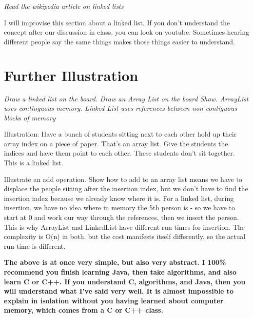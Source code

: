 \documentclass[12pt]{article}
\begin{document}
\textit{Read the wikipedia article on linked lists}

I will improvise this section about a linked list. If you don't understand the concept after our discussion in class, you can look on youtube. Sometimes hearing different people say the same things makes those things easier to understand.

\section{Further Illustration}
\begin{center}
{\LARGE \textit{Draw a linked list on the board. Draw an Array List on the board Show. ArrayList uses continguous memory. Linked List uses references between non-contiguous blocks of memory}}
\end{center}

\begin{center}
{\LARGE Illustration: Have a  bunch of students sitting next to each other hold up their array index on a piece of paper. That's an array list. Give the students the indices and have them point to each other. These students don't sit together. This is a linked list.}
\end{center}

\begin{center}
{\LARGE Illustrate an add operation. Show how to add to an array list means we have to displace the people sitting after the insertion index, but we don't have to find the insertion index because we already know where it is. For a linked list, during insertion, we have no idea where in memory the 5th person is - so we have to start at 0 and work our way through the references, then we insert the person. This is why ArrayList and LinkedList have different run times for insertion. The complexity is O(n) in both, but the cost manifests itself differently, so the actual run time is different.}
\end{center}

\begin{center}
\textbf{The above is at once very simple, but also very abstract. I 100\% recommend you finish learning Java, then take algorithms, and also learn C or C++. If you understand C, algorithms, and Java, then you will understand what I've said very well. It is almost impossible to explain in isolation without you having learned about computer memory, which comes from a C or C++ class.}
\end{center}
\end{document}
